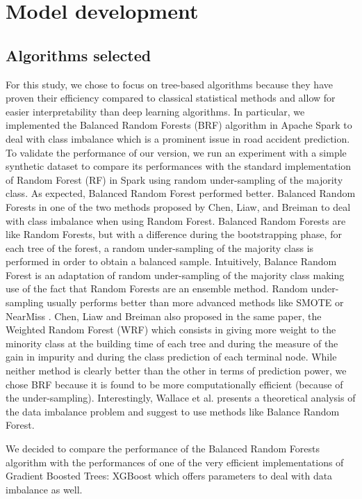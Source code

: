 \documentclass[conference]{IEEEtran}
\begin{document}
\section{Model development}

\subsection{Algorithms selected}
For this study, we chose to focus on tree-based algorithms because they have proven their efficiency compared to classical statistical methods and allow for easier interpretability than deep learning algorithms.
In particular, we implemented the Balanced Random Forests (BRF) algorithm in Apache Spark to deal with class imbalance which is a prominent issue in road accident prediction.
To validate the performance of our version, we run an experiment with a simple synthetic dataset to compare its performances with the standard implementation of Random Forest (RF) in Spark using random under-sampling of the majority class.
As expected, Balanced Random Forest performed better.
Balanced Random Forests in one of the two methods proposed by Chen, Liaw, and Breiman\cite{Chen2004} to deal with class imbalance when using Random Forest.
Balanced Random Forests are like Random Forests, but with a difference during the bootstrapping phase, for each tree of the forest, a random under-sampling of the majority class is performed in order to obtain a balanced sample.
Intuitively, Balance Random Forest is an adaptation of random under-sampling of the majority class making use of the fact that Random Forests are an ensemble method.
Random under-sampling usually performs better than more advanced methods like SMOTE or NearMiss \cite{Branco2016}.
Chen, Liaw and Breiman\cite{Chen2004} also proposed in the same paper, the Weighted Random Forest (WRF) which consists in giving more weight to the minority class at the building time of each tree and during the measure of the gain in impurity and during the class prediction of each terminal node.
While neither method is clearly better than the other in terms of prediction power, we chose BRF because it is found to be more computationally efficient (because of the under-sampling).
Interestingly, Wallace et al. \cite{Wallace2011} presents a theoretical analysis of the data imbalance problem and suggest to use methods like Balance Random Forest.

We decided to compare the performance of the Balanced Random Forests algorithm with the performances of one of the very efficient implementations of Gradient Boosted Trees: XGBoost which offers parameters to deal with data imbalance as well.
\end{document}
